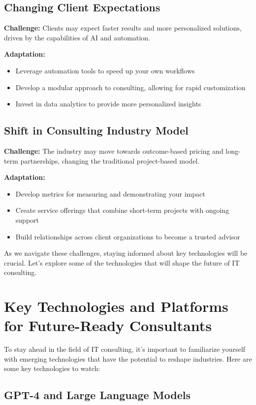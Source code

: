 \subsection{Changing Client Expectations}

\textbf{Challenge:} Clients may expect faster results and more personalized solutions, driven by the capabilities of AI and automation.

\textbf{Adaptation:}
\begin{itemize}
    \item Leverage automation tools to speed up your own workflows
    \item Develop a modular approach to consulting, allowing for rapid customization
    \item Invest in data analytics to provide more personalized insights
\end{itemize}
%
\subsection{Shift in Consulting Industry Model}

\textbf{Challenge:} The industry may move towards outcome-based pricing and long-term partnerships, changing the traditional project-based model.

\textbf{Adaptation:}
\begin{itemize}
    \item Develop metrics for measuring and demonstrating your impact
    \item Create service offerings that combine short-term projects with ongoing support
    \item Build relationships across client organizations to become a trusted advisor
\end{itemize}

As we navigate these challenges, staying informed about key technologies will be crucial. Let's explore some of the technologies that will shape the future of IT consulting.
%
\section{Key Technologies and Platforms for Future-Ready Consultants}

To stay ahead in the field of IT consulting, it's important to familiarize yourself with emerging technologies that have the potential to reshape industries. Here are some key technologies to watch:

\subsection{GPT-4 and Large Language Models}


